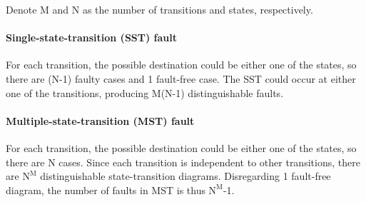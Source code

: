 Denote M and N as the number of transitions and states, respectively. 
\paragraph{Single-state-transition (SST) fault}
For each transition, the possible destination could be either one of the states, so there are (N-1) faulty cases and 1 fault-free case. The SST could occur at either one of the transitions, producing M(N-1) distinguishable faults.
\paragraph{Multiple-state-transition (MST) fault}
For each transition, the possible destination could be either one of the states, so there are N cases. Since each transition is independent to other transitions, there are $\text{N}^\text{M}$ distinguishable state-transition diagrams. Disregarding 1 fault-free diagram, the number of faults in MST is thus $\text{N}^\text{M}$-1.
